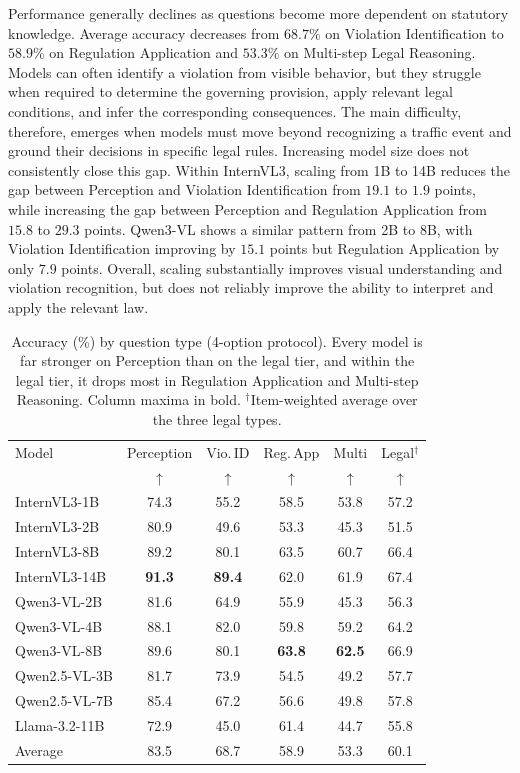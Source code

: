 Performance generally declines as questions become more dependent on statutory knowledge. Average accuracy decreases from $68.7\%$ on Violation Identification to $58.9\%$ on Regulation Application and $53.3\%$ on Multi-step Legal Reasoning. Models can often identify a violation from visible behavior, but they struggle when required to determine the governing provision, apply relevant legal conditions, and infer the corresponding consequences. The main difficulty, therefore, emerges when models must move beyond recognizing a traffic event and ground their decisions in specific legal rules. Increasing model size does not consistently close this gap. Within InternVL3, scaling from 1B to 14B reduces the gap between Perception and Violation Identification from $19.1$ to $1.9$ points, while increasing the gap between Perception and Regulation Application from $15.8$ to $29.3$ points. Qwen3-VL shows a similar pattern from 2B to 8B, with Violation Identification improving by $15.1$ points but Regulation Application by only $7.9$ points. Overall, scaling substantially improves visual understanding and violation recognition, but does not reliably improve the ability to interpret and apply the relevant law.

\begin{table}[t]
\centering
\caption{Accuracy (\%) by question type (4-option protocol). Every model is far stronger on Perception than on the legal tier, and within the legal tier, it drops most in Regulation Application and Multi-step Reasoning. Column maxima in bold. $^{\dagger}$Item-weighted average over the three legal types.}
\label{tab:pertype}
\setlength{\tabcolsep}{6pt}
\begin{tabular}{lccccc}
\toprule
Model & Perception & Vio.\,ID & Reg.\,App & Multi & Legal$^{\dagger}$ \\
& $\uparrow$ & $\uparrow$ & $\uparrow$ & $\uparrow$ & $\uparrow$ \\
\midrule
InternVL3-1B  & 74.3 & 55.2 & 58.5 & 53.8 & 57.2 \\
InternVL3-2B  & 80.9 & 49.6 & 53.3 & 45.3 & 51.5 \\
InternVL3-8B  & 89.2 & 80.1 & 63.5 & 60.7 & 66.4 \\
InternVL3-14B & \textbf{91.3} & \textbf{89.4} & 62.0 & 61.9 & 67.4 \\
Qwen3-VL-2B   & 81.6 & 64.9 & 55.9 & 45.3 & 56.3 \\
Qwen3-VL-4B   & 88.1 & 82.0 & 59.8 & 59.2 & 64.2 \\
Qwen3-VL-8B   & 89.6 & 80.1 & \textbf{63.8} & \textbf{62.5} & 66.9 \\
Qwen2.5-VL-3B & 81.7 & 73.9 & 54.5 & 49.2 & 57.7 \\
Qwen2.5-VL-7B & 85.4 & 67.2 & 56.6 & 49.8 & 57.8 \\
Llama-3.2-11B & 72.9 & 45.0 & 61.4 & 44.7 & 55.8 \\
\midrule
Average
& 83.5
& 68.7
& 58.9
& 53.3
& 60.1 \\
\bottomrule
\end{tabular}
\end{table}

